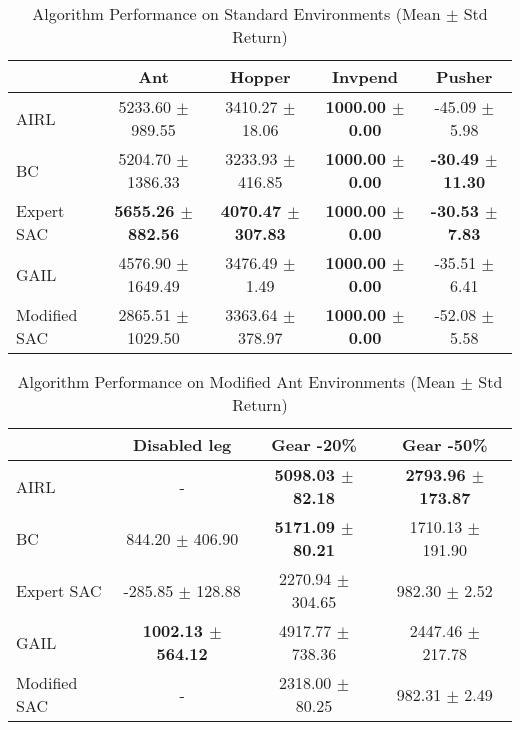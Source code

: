 \documentclass{article}
\begin{document}
\pagestyle{empty}


\begin{table}
\caption{Algorithm Performance on Standard Environments (Mean $\pm$ Std Return)}
\label{tab:perf_standard}
\begin{adjustbox}{max width=\textwidth, center}
\begin{tabular}{lcccc}
\toprule
 & Ant & Hopper & Invpend & Pusher \\
\midrule
AIRL & 5233.60 $\pm$ 989.55 & 3410.27 $\pm$ 18.06 & \textbf{1000.00 $\pm$ 0.00} & -45.09 $\pm$ 5.98 \\
BC & 5204.70 $\pm$ 1386.33 & 3233.93 $\pm$ 416.85 & \textbf{1000.00 $\pm$ 0.00} & \textbf{-30.49 $\pm$ 11.30} \\
Expert SAC & \textbf{5655.26 $\pm$ 882.56} & \textbf{4070.47 $\pm$ 307.83} & \textbf{1000.00 $\pm$ 0.00} & \textbf{-30.53 $\pm$ 7.83} \\
GAIL & 4576.90 $\pm$ 1649.49 & 3476.49 $\pm$ 1.49 & \textbf{1000.00 $\pm$ 0.00} & -35.51 $\pm$ 6.41 \\
Modified SAC & 2865.51 $\pm$ 1029.50 & 3363.64 $\pm$ 378.97 & \textbf{1000.00 $\pm$ 0.00} & -52.08 $\pm$ 5.58 \\
\bottomrule
\end{tabular}
\end{adjustbox}
\end{table}



\begin{table}
\caption{Algorithm Performance on Modified Ant Environments (Mean $\pm$ Std Return)}
\label{tab:perf_mod_ant}
\begin{adjustbox}{max width=\textwidth, center}
\begin{tabular}{lccc}
\toprule
 & Disabled leg & Gear -20\% & Gear -50\% \\
\midrule
AIRL & - & \textbf{5098.03 $\pm$ 82.18} & \textbf{2793.96 $\pm$ 173.87} \\
BC & 844.20 $\pm$ 406.90 & \textbf{5171.09 $\pm$ 80.21} & 1710.13 $\pm$ 191.90 \\
Expert SAC & -285.85 $\pm$ 128.88 & 2270.94 $\pm$ 304.65 & 982.30 $\pm$ 2.52 \\
GAIL & \textbf{1002.13 $\pm$ 564.12} & 4917.77 $\pm$ 738.36 & 2447.46 $\pm$ 217.78 \\
Modified SAC & - & 2318.00 $\pm$ 80.25 & 982.31 $\pm$ 2.49 \\
\bottomrule
\end{tabular}
\end{adjustbox}
\end{table}
\end{document}
